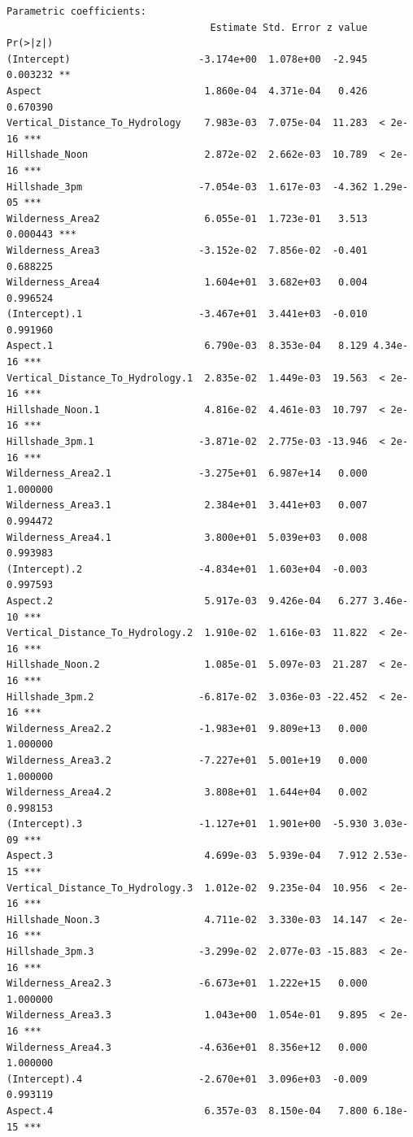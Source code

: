 \documentclass[12pt]{article}
\begin{document}
\begin{verbatim}
Parametric coefficients:
                                   Estimate Std. Error z value Pr(>|z|)
(Intercept)                      -3.174e+00  1.078e+00  -2.945 0.003232 **
Aspect                            1.860e-04  4.371e-04   0.426 0.670390
Vertical_Distance_To_Hydrology    7.983e-03  7.075e-04  11.283  < 2e-16 ***
Hillshade_Noon                    2.872e-02  2.662e-03  10.789  < 2e-16 ***
Hillshade_3pm                    -7.054e-03  1.617e-03  -4.362 1.29e-05 ***
Wilderness_Area2                  6.055e-01  1.723e-01   3.513 0.000443 ***
Wilderness_Area3                 -3.152e-02  7.856e-02  -0.401 0.688225
Wilderness_Area4                  1.604e+01  3.682e+03   0.004 0.996524
(Intercept).1                    -3.467e+01  3.441e+03  -0.010 0.991960
Aspect.1                          6.790e-03  8.353e-04   8.129 4.34e-16 ***
Vertical_Distance_To_Hydrology.1  2.835e-02  1.449e-03  19.563  < 2e-16 ***
Hillshade_Noon.1                  4.816e-02  4.461e-03  10.797  < 2e-16 ***
Hillshade_3pm.1                  -3.871e-02  2.775e-03 -13.946  < 2e-16 ***
Wilderness_Area2.1               -3.275e+01  6.987e+14   0.000 1.000000
Wilderness_Area3.1                2.384e+01  3.441e+03   0.007 0.994472
Wilderness_Area4.1                3.800e+01  5.039e+03   0.008 0.993983
(Intercept).2                    -4.834e+01  1.603e+04  -0.003 0.997593
Aspect.2                          5.917e-03  9.426e-04   6.277 3.46e-10 ***
Vertical_Distance_To_Hydrology.2  1.910e-02  1.616e-03  11.822  < 2e-16 ***
Hillshade_Noon.2                  1.085e-01  5.097e-03  21.287  < 2e-16 ***
Hillshade_3pm.2                  -6.817e-02  3.036e-03 -22.452  < 2e-16 ***
Wilderness_Area2.2               -1.983e+01  9.809e+13   0.000 1.000000
Wilderness_Area3.2               -7.227e+01  5.001e+19   0.000 1.000000
Wilderness_Area4.2                3.808e+01  1.644e+04   0.002 0.998153
(Intercept).3                    -1.127e+01  1.901e+00  -5.930 3.03e-09 ***
Aspect.3                          4.699e-03  5.939e-04   7.912 2.53e-15 ***
Vertical_Distance_To_Hydrology.3  1.012e-02  9.235e-04  10.956  < 2e-16 ***
Hillshade_Noon.3                  4.711e-02  3.330e-03  14.147  < 2e-16 ***
Hillshade_3pm.3                  -3.299e-02  2.077e-03 -15.883  < 2e-16 ***
Wilderness_Area2.3               -6.673e+01  1.222e+15   0.000 1.000000
Wilderness_Area3.3                1.043e+00  1.054e-01   9.895  < 2e-16 ***
Wilderness_Area4.3               -4.636e+01  8.356e+12   0.000 1.000000
(Intercept).4                    -2.670e+01  3.096e+03  -0.009 0.993119
Aspect.4                          6.357e-03  8.150e-04   7.800 6.18e-15 ***

\end{verbatim}
\end{document}

